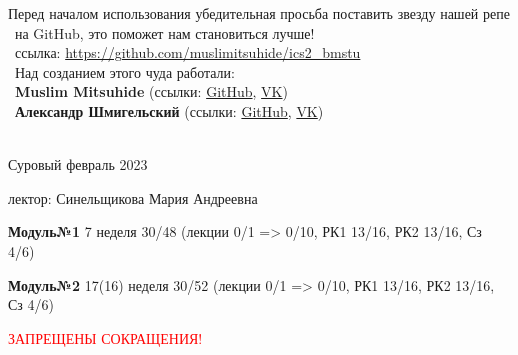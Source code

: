 \normalsize{ 

Перед началом использования убедительная просьба поставить звезду нашей репе\\\
на GitHub, это поможет нам становиться лучше!\\\
ссылка: \textcolor{blue}{\url{https://github.com/muslimitsuhide/ics2_bmstu}}\\\
Над созданием этого чуда работали:\\\
\textbf{Muslim Mitsuhide} (ссылки: \textcolor{purple}{\href{https://github.com/muslimitsuhide}{GitHub}}, \textcolor{purple}{\href{https://vk.com/muslimitsuhide}{VK}})\\\
\textbf{Александр Шмигельский} (ссылки: \textcolor{purple}{\href{https://github.com/AlexShmigelskii}{GitHub}}, \textcolor{purple}{\href{https://vk.com/syn_maminoy_podrug}{VK}})\\\

\hfill \break
\hfill \break
\begin{center} Суровый февраль 2023 \end{center}
 
\thispagestyle{empty} %

\newpage

 \par лектор: Синельщикова Мария Андреевна
 \par  \textbf{Модуль№1} 7 неделя 30/48 (лекции 0/1 => 0/10, РК1 13/16, РК2 13/16, Сз 4/6)
 \par  \textbf{Модуль№2} 17(16) неделя 30/52 (лекции 0/1 => 0/10, РК1 13/16, РК2 13/16, Сз 4/6)
 \par \textcolor{red}{ЗАПРЕЩЕНЫ СОКРАЩЕНИЯ!}
 
}
